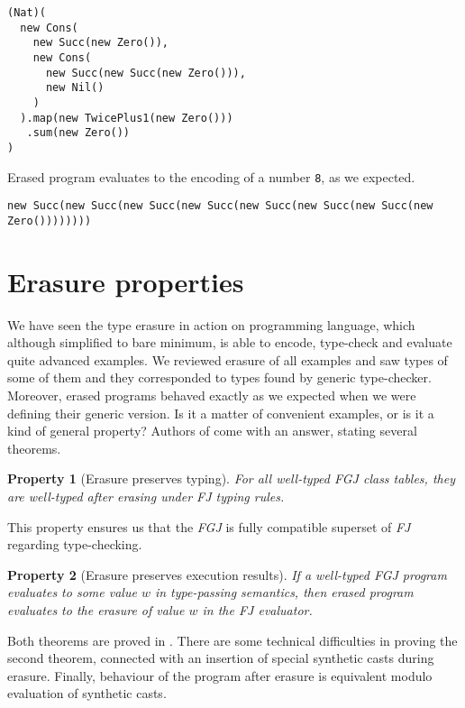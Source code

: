 \documentclass{article}[12pt]
\begin{document}
\begin{verbatim}
(Nat)(
  new Cons(
    new Succ(new Zero()),
    new Cons(
      new Succ(new Succ(new Zero())),
      new Nil()
    )
  ).map(new TwicePlus1(new Zero()))
   .sum(new Zero())
)
\end{verbatim}
Erased program evaluates to the encoding of a number \texttt{8},
as we expected.

\begin{verbatim}
new Succ(new Succ(new Succ(new Succ(new Succ(new Succ(new Succ(new Zero())))))))
\end{verbatim}


\section{Erasure properties}

We have seen the type erasure in action on programming language,
which although simplified to bare minimum, is able to encode,
type-check and evaluate quite advanced examples. We reviewed
erasure of all examples and saw types of some of them and
they corresponded to types found by generic type-checker. Moreover,
erased programs behaved exactly as we expected when we were
defining their generic version. Is it a matter of convenient
examples, or is it a kind of general property?
Authors of \cite{fj} come with an answer, stating several theorems.

\newtheorem{theorem}{Property}
\begin{theorem}[Erasure preserves typing]
For all well-typed \emph{FGJ} class tables, they are well-typed
after erasing under \emph{FJ} typing rules.
\end{theorem}
This property ensures us that the \emph{FGJ} is fully compatible
superset of \emph{FJ} regarding type-checking.

\begin{theorem}[Erasure preserves execution results]
If a well-typed \emph{FGJ} program evaluates to some value $w$
in type-passing semantics, then erased program evaluates to
the erasure of value $w$ in the \emph{FJ} evaluator.
\end{theorem}

Both theorems are proved in \cite{fj}. There are some technical
difficulties in proving the second theorem, connected with an
insertion of special synthetic casts during erasure. Finally,
behaviour of the program after erasure is equivalent modulo
evaluation of synthetic casts.
\end{document}
